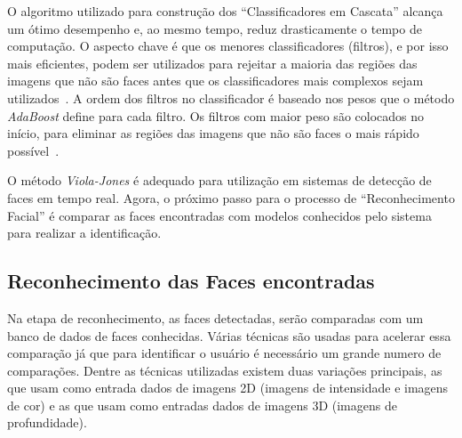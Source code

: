 O algoritmo utilizado para construção dos ``Classificadores em Cascata'' alcança um ótimo desempenho e, ao mesmo tempo, reduz drasticamente o tempo de computação. O aspecto chave é que os menores classificadores (filtros), e por isso mais eficientes, podem ser utilizados para rejeitar a maioria das regiões das imagens que não são faces antes que os classificadores mais complexos sejam utilizados~\cite{violajones}. A ordem dos filtros no classificador é baseado nos pesos que o método \textit{AdaBoost} define para cada filtro. Os filtros com maior peso são colocados no início, para eliminar as regiões das imagens que não são faces o mais rápido possível~\cite{servodetection}. 

O método \textit{Viola-Jones} é adequado para utilização em sistemas de detecção de faces em tempo real. Agora, o próximo passo para o processo de ``Reconhecimento Facial'' é comparar as faces encontradas com modelos conhecidos pelo sistema para realizar a identificação.


\subsection{Reconhecimento das Faces encontradas}

Na etapa de reconhecimento, as faces detectadas, serão comparadas com um banco de dados de faces conhecidas. Várias técnicas são usadas para acelerar essa comparação já que para identificar o usuário é necessário um grande numero de comparações. Dentre as técnicas utilizadas existem duas variações principais, as que usam como entrada dados de imagens 2D (imagens de intensidade e imagens de cor) e as que usam como entradas dados de imagens 3D (imagens de profundidade).

